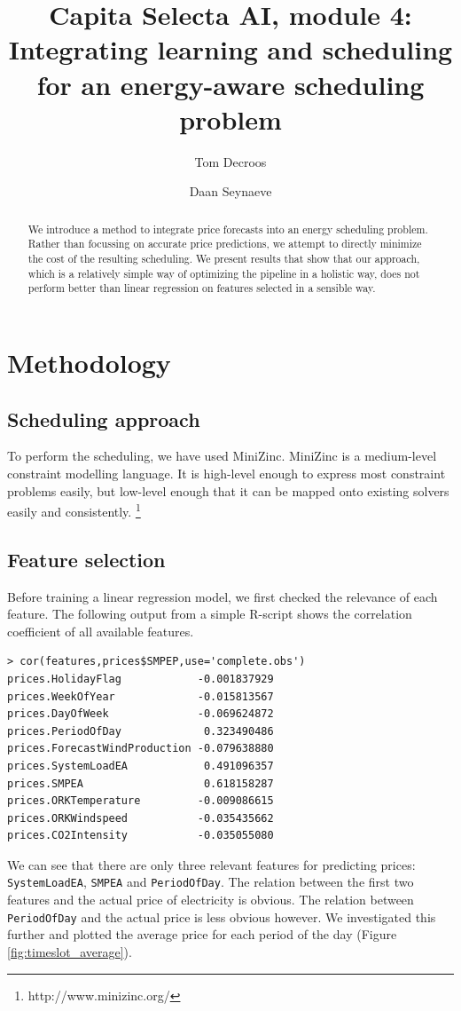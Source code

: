 \documentclass[a4,10pt]{article}
\title{Capita Selecta AI, module 4:\\ Integrating learning and scheduling for an energy-aware scheduling problem}
\author{Tom Decroos \and Daan Seynaeve}
\begin{document}
\maketitle
\begin{abstract}
	We introduce a method to integrate price forecasts into an energy scheduling problem. Rather than focussing on accurate price predictions, we attempt to directly minimize the cost of the resulting scheduling. We present results that show that our approach, which is a relatively simple way of optimizing the pipeline in a holistic way, does not perform better than linear regression on features selected in a sensible way.
\end{abstract}
\section{Methodology}
\subsection{Scheduling approach}
To perform the scheduling, we have used MiniZinc. MiniZinc is a medium-level constraint modelling language. It is high-level enough to express most constraint problems easily, but low-level enough that it can be mapped onto existing solvers easily and consistently. \footnote{http://www.minizinc.org/}

\subsection{Feature selection}
Before training a linear regression model, we first checked the relevance of each feature. The following output from a simple R-script shows the correlation coefficient of all available features.
\begin{verbatim}
> cor(features,prices$SMPEP,use='complete.obs')
prices.HolidayFlag            -0.001837929
prices.WeekOfYear             -0.015813567
prices.DayOfWeek              -0.069624872
prices.PeriodOfDay             0.323490486
prices.ForecastWindProduction -0.079638880
prices.SystemLoadEA            0.491096357
prices.SMPEA                   0.618158287
prices.ORKTemperature         -0.009086615
prices.ORKWindspeed           -0.035435662
prices.CO2Intensity           -0.035055080
\end{verbatim}
We can see that there are only three relevant features for predicting prices: \verb|SystemLoadEA|, \verb|SMPEA| and \verb|PeriodOfDay|. The relation between the first two features and the actual price of electricity is obvious. The relation between \verb|PeriodOfDay| and the actual price is less obvious however. We investigated this further and plotted the average price for each period of the day (Figure \ref{fig:timeslot_average}).
\end{document}
